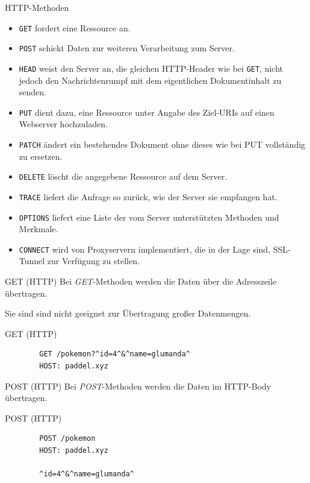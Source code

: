 \begin{defi}{HTTP-Methoden}
    \begin{itemize}
        \item \texttt{GET} fordert eine Ressource an.
        \item \texttt{POST} schickt Daten zur weiteren Verarbeitung zum Server.
        \item \texttt{HEAD} weist den Server an, die gleichen HTTP-Header wie bei \texttt{GET}, nicht jedoch den Nachrichtenrumpf mit dem eigentlichen Dokumentinhalt zu senden.
        \item \texttt{PUT} dient dazu, eine Ressource unter Angabe des Ziel-URIs auf einen Webserver hochzuladen.
        \item \texttt{PATCH} ändert ein bestehendes Dokument ohne dieses wie bei PUT vollständig zu ersetzen.
        \item \texttt{DELETE} löscht die angegebene Ressource auf dem Server.
        \item \texttt{TRACE} liefert die Anfrage so zurück, wie der Server sie empfangen hat.
        \item \texttt{OPTIONS} liefert eine Liste der vom Server unterstützten Methoden und Merkmale.
        \item \texttt{CONNECT} wird von Proxyservern implementiert, die in der Lage sind, SSL-Tunnel zur Verfügung zu stellen.
    \end{itemize}
\end{defi}

\begin{defi}{GET (HTTP)}
    Bei \emph{GET}-Methoden werden die Daten über die Adresszeile übertragen.

    Sie sind sind nicht geeignet zur Übertragung großer Datenmengen.
\end{defi}

\begin{example}{GET (HTTP)}
    \begin{lstlisting} 
        GET /pokemon?^id=4^&^name=glumanda^
        HOST: paddel.xyz
    \end{lstlisting}
\end{example}

\begin{defi}{POST (HTTP)}
    Bei \emph{POST}-Methoden werden die Daten im HTTP-Body übertragen.
\end{defi}

\begin{example}{POST (HTTP)}
    \begin{lstlisting} 
        POST /pokemon
        HOST: paddel.xyz

        ^id=4^&^name=glumanda^
    \end{lstlisting}
\end{example}

